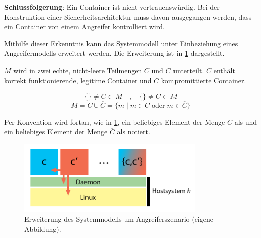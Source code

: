 \documentclass[../main.tex]{subfiles}
\begin{document}
    \textbf{Schlussfolgerung}: Ein Container ist nicht vertrauenswürdig. Bei der Konstruktion einer Sicherheitsarchitektur muss davon ausgegangen werden, dass ein Container von einem Angreifer kontrolliert wird.

    Mithilfe dieser Erkenntnis kann das Systemmodell unter Einbeziehung eines Angreifermodells erweitert werden. Die Erweiterung ist in \fig \ref{fig:question_model2} dargestellt.

    \(M\) wird in zwei echte, nicht-leere Teilmengen \(C\) und \(\overline{C}\) unterteilt. \(C\) enthält korrekt funktionierende, legitime Container und \(\overline{C}\) kompromittierte Container.

    \begin{equation}
    \label{eq:subsets}
      \{\}\neq C \subset M \quad,\quad \{\}\neq \overline{C} \subset M %
    \end{equation}
    \begin{equation}
    \label{eq:unionset}
      M = C \cup \overline{C} = \{m \; | \; m\in C \; \text{oder} \; m\in \overline{C}\}
    \end{equation}

    Per Konvention wird fortan, wie in \fig \ref{fig:question_model2}, ein beliebiges Element der Menge \(C\) als \cvalid{} und ein beliebiges Element der Menge \(\overline{C}\) als \cbroken{} notiert.

    \begin{figure}[h]
        \centering
        \includegraphics[width=0.8\textwidth]{./images/question_model2.png}
        \caption{Erweiterung des Systemmodells um Angreiferszenario (eigene Abbildung).}
        \label{fig:question_model2}
    \end{figure}
\end{document}
